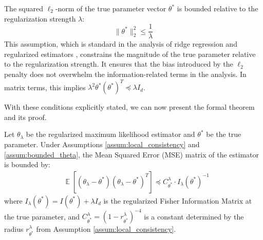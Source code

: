 \documentclass{article}
\DeclareMathOperator*{\E}{\mathbb{E}} %
\begin{document}
\begin{assumption}
\label{assum:bounded_theta}
The squared $\ell_2$-norm of the true parameter vector $\theta^*$ is bounded relative to the regularization strength $\lambda$:
\[ \|\theta^*\|_2^2 \le \frac{1}{\lambda} \]
This assumption, which is standard in the analysis of ridge regression and regularized estimators \cite{mutny2024modern}, constrains the magnitude of the true parameter relative to the regularization strength. It ensures that the bias introduced by the $\ell_2$ penalty does not overwhelm the information-related terms in the analysis. In matrix terms, this implies $\lambda^2 \theta^* (\theta^*)^T \preceq \lambda I_d$.
\end{assumption}

With these conditions explicitly stated, we can now present the formal theorem and its proof.

\begin{theorem}
\label{thm:mse_bound_formal}
Let $\theta_\lambda$ be the regularized maximum likelihood estimator and $\theta^*$ be the true parameter. Under Assumptions \ref{assum:local_consistency} and \ref{assum:bounded_theta}, the Mean Squared Error (MSE) matrix of the estimator is bounded by:
\begin{align*}
&\E[(\theta_\lambda - \theta^*)(\theta_\lambda - \theta^*)^T] \preceq C^{\lambda}_{\theta^*} \cdot I_\lambda(\theta^*)^{-1}
\end{align*}
where $I_\lambda(\theta^*) = I(\theta^*) + \lambda I_d$ is the regularized Fisher Information Matrix at the true parameter, and $C^{\lambda}_{\theta^*} = (1-r^{\lambda}_{\theta^*})^{-4}$ is a constant determined by the radius $r^{\lambda}_{\theta^*}$ from Assumption \ref{assum:local_consistency}.
\end{theorem}
\end{document}
